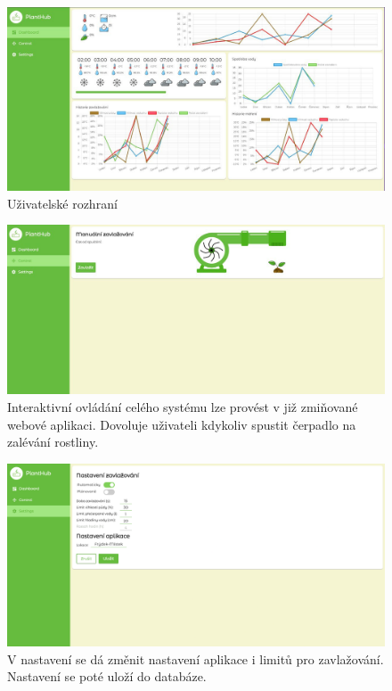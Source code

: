 \documentclass[11pt,a4paper]{article}
\begin{document}
\begin{figure}[h]
	\centering
	\includegraphics[width=0.9\linewidth]{web-ui.png}
	\caption{Uživatelské rozhraní}
\end{figure}

\begin{figure}[h]
	\centering
	\includegraphics[width=0.9\linewidth]{web-ui-pump.png}
	\caption{Interaktivní ovládání celého systému lze provést v již
		zmiňované webové aplikaci. Dovoluje uživateli kdykoliv spustit
		čerpadlo na
		zalévání rostliny.}
\end{figure}

\begin{figure}[h]
	\centering
	\includegraphics[width=0.9\linewidth]{web-ui-settings.png}
	\caption{V nastavení se dá změnit nastavení aplikace i limitů pro
		zavlažování. Nastavení se poté uloží do databáze.}
\end{figure}
\end{document}
